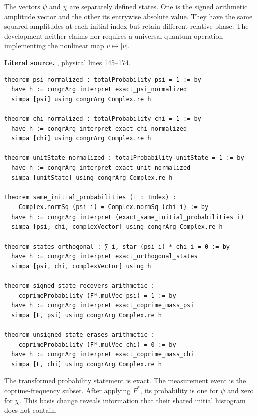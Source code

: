 The vectors \(\psi\) and \(\chi\) are separately defined states. One is the
signed arithmetic amplitude vector and the other its entrywise absolute value.
They have the same squared amplitudes at each initial index but retain different
relative phase. The development neither claims nor requires a universal quantum
operation implementing the nonlinear map \(v\mapsto |v|\).

\noindent\textbf{Literal source.} \texttt{}, physical lines 145--174.

\begin{Verbatim}[breaklines=true,breakanywhere=true,fontsize=\footnotesize]
theorem psi_normalized : totalProbability psi = 1 := by
  have h := congrArg interpret exact_psi_normalized
  simpa [psi] using congrArg Complex.re h

theorem chi_normalized : totalProbability chi = 1 := by
  have h := congrArg interpret exact_chi_normalized
  simpa [chi] using congrArg Complex.re h

theorem unitState_normalized : totalProbability unitState = 1 := by
  have h := congrArg interpret exact_unit_normalized
  simpa [unitState] using congrArg Complex.re h

theorem same_initial_probabilities (i : Index) :
    Complex.normSq (psi i) = Complex.normSq (chi i) := by
  have h := congrArg interpret (exact_same_initial_probabilities i)
  simpa [psi, chi, complexVector] using congrArg Complex.re h

theorem states_orthogonal : ∑ i, star (psi i) * chi i = 0 := by
  have h := congrArg interpret exact_orthogonal_states
  simpa [psi, chi, complexVector] using h

theorem signed_state_recovers_arithmetic :
    coprimeProbability (Fᴴ.mulVec psi) = 1 := by
  have h := congrArg interpret exact_coprime_mass_psi
  simpa [F, psi] using congrArg Complex.re h

theorem unsigned_state_erases_arithmetic :
    coprimeProbability (Fᴴ.mulVec chi) = 0 := by
  have h := congrArg interpret exact_coprime_mass_chi
  simpa [F, chi] using congrArg Complex.re h
\end{Verbatim}

The transformed probability statement is exact. The measurement event is the
coprime-frequency subset. After applying \(F^*\), its probability is one for
\(\psi\) and zero for \(\chi\). This basis change reveals information that their
shared initial histogram does not contain.

